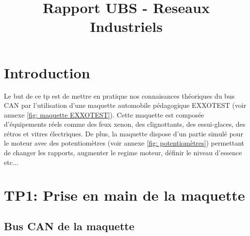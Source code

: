 \documentclass{rapportECC}
\title{Rapport UBS - Reseaux Industriels} %
\begin{document}





        
\fairemarges %
\fairepagedegarde %
\tabledematieres %



\section{Introduction} 

Le but de ce tp est de mettre en pratique nos connaisances théoriques du bus CAN par l'utilisation d'une maquette automobile pédagogique EXXOTEST (voir annexe \ref{fig: maquette EXXOTEST}). Cette maquette est composée d'équipements réels comme des feux xenon, des clignottants, des essui-glaces, des rétros et vitres électriques. De plus, la maquette dispose d'un partie simulé pour le moteur avec des potentiomètres (voir annexe \ref{fig: potentiomètres}) permettant de changer les rapports, augmenter le regime moteur, définir le niveau d'essence etc... 

\section{TP1: Prise en main de la maquette}

\subsection{Bus CAN de la maquette}
\end{document}
